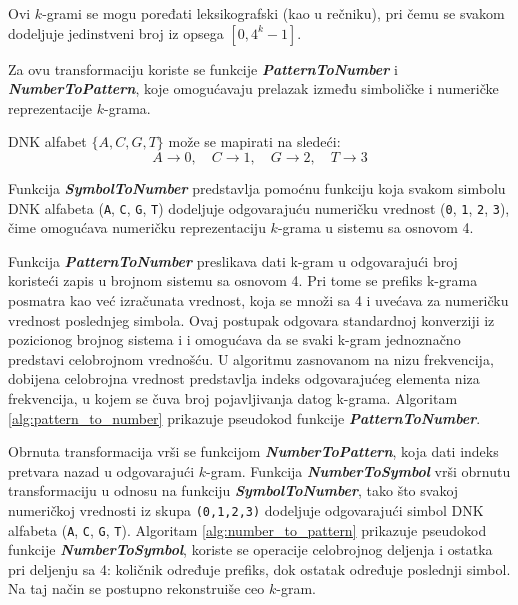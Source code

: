 \documentclass[12pt,oneside]{memoir}
\begin{document}
Ovi $k$-grami se mogu poređati leksikografski (kao u rečniku), pri čemu se svakom dodeljuje jedinstveni broj iz opsega $[0, 4^k - 1]$.

Za ovu transformaciju koriste se funkcije \textit{\textbf{PatternToNumber}} i \textit{\textbf{NumberToPattern}}, koje omogućavaju prelazak između simboličke i numeričke reprezentacije $k$-grama.

DNK alfabet $\{A, C, G, T\}$  može se mapirati na sledeći:
\[
A \rightarrow 0,\quad C \rightarrow 1,\quad G \rightarrow 2,\quad T \rightarrow 3
\]


Funkcija \textit{\textbf{SymbolToNumber}} predstavlja pomoćnu funkciju koja svakom simbolu DNK alfabeta (\texttt{A}, \texttt{C}, \texttt{G}, \texttt{T}) dodeljuje odgovarajuću numeričku vrednost (\texttt{0}, \texttt{1}, \texttt{2}, \texttt{3}), čime omogućava numeričku reprezentaciju $k$-grama u sistemu sa osnovom 4.

Funkcija \textit{\textbf{PatternToNumber}} preslikava dati k-gram u odgovarajući broj koristeći zapis u brojnom sistemu sa osnovom 4. Pri tome se prefiks k-grama posmatra kao već izračunata vrednost, koja se množi sa 4 i uvećava za numeričku vrednost poslednjeg simbola. Ovaj postupak odgovara standardnoj konverziji iz pozicionog brojnog sistema i i omogućava da se svaki k-gram jednoznačno predstavi celobrojnom vrednošću. U algoritmu zasnovanom na nizu frekvencija, dobijena celobrojna vrednost predstavlja indeks odgovarajućeg elementa niza frekvencija, u kojem se čuva broj pojavljivanja datog k-grama. Algoritam \ref{alg:pattern_to_number} prikazuje pseudokod  funkcije \textit{\textbf{PatternToNumber}}.

\begin{algorithm}[h]
\caption{PatternToNumber}
\label{alg:pattern_to_number}
\SetAlgoLined
\DontPrintSemicolon
{}
\end{algorithm}

Obrnuta transformacija vrši se funkcijom \textit{\textbf{NumberToPattern}}, koja dati indeks pretvara nazad u odgovarajući $k$-gram. Funkcija \textit{\textbf{NumberToSymbol}} vrši obrnutu transformaciju u odnosu na funkciju \textit{\textbf{SymbolToNumber}}, tako što svakoj numeričkoj vrednosti iz skupa \texttt{(0,1,2,3)} dodeljuje odgovarajući simbol DNK alfabeta (\texttt{A}, \texttt{C}, \texttt{G}, \texttt{T}). Algoritam \ref{alg:number_to_pattern} prikazuje pseudokod funkcije \textit{\textbf{NumberToSymbol}}, koriste se operacije celobrojnog deljenja i ostatka pri deljenju sa 4: količnik određuje prefiks, dok ostatak određuje poslednji simbol. Na taj način se postupno rekonstruiše ceo $k$-gram. 
\end{document}
